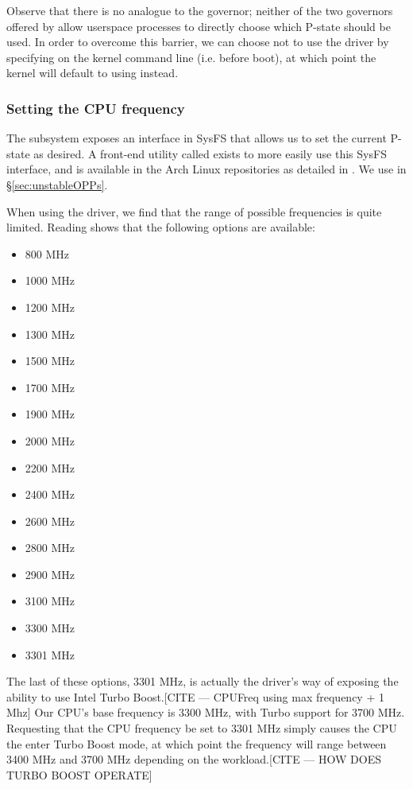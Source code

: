Observe that there is no analogue to the  governor; neither of
the two governors offered by  allow userspace processes to
directly choose which P-state should be used. In order to overcome this barrier,
we can choose not to use the  driver by specifying
 on the kernel command line (i.e. before boot),
at which point the kernel will default to using  instead.

\subsubsection{Setting the CPU frequency}
\label{sec:cpupower}

The  subsystem exposes an interface in SysFS that allows us to
set the current P-state as desired. A front-end utility called 
exists to more easily use this SysFS interface, and is available in the Arch
Linux repositories as detailed in \cite{archFrequency}. We use 
in §\ref{sec:unstableOPPs}.

When using the  driver, we find that the range of possible
frequencies is quite limited. Reading  shows that the
following options are available:

\begin{multicols}{3}\raggedcolumns
    \begin{itemize}
        \item 800 MHz
        \item 1000 MHz
        \item 1200 MHz
        \item 1300 MHz
        \item 1500 MHz
        \item 1700 MHz
        \item 1900 MHz
        \item 2000 MHz
        \item 2200 MHz
        \item 2400 MHz
        \item 2600 MHz
        \item 2800 MHz
        \item 2900 MHz
        \item 3100 MHz
        \item 3300 MHz
        \item 3301 MHz
    \end{itemize}
\end{multicols}

The last of these options, 3301 MHz, is actually the driver's way of exposing
the ability to use Intel Turbo Boost.[CITE — CPUFreq using max frequency + 1 Mhz]
Our CPU's base frequency is 3300 MHz,
with Turbo support for 3700 MHz. Requesting that the CPU frequency be set to
3301 MHz simply causes the CPU the enter Turbo Boost mode, at which point the
frequency will range between 3400 MHz and 3700 MHz depending on the
workload.[CITE — HOW DOES TURBO BOOST OPERATE]
